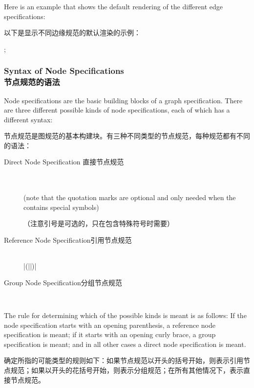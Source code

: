Here is an example that shows the default rendering of the different edge
specifications:

以下是显示不同边缘规范的默认渲染的示例：
%
\begin{codeexample}[preamble={\usetikzlibrary{graphs}}]
\tikz {};
\end{codeexample}


\subsubsection{Syntax of Node Specifications\\节点规范的语法}
\label{section-library-graphs-node-spec}

Node specifications are the basic building blocks of a graph specification.
There are three different possible kinds of node specifications, each of which
has a different syntax:

节点规范是图规范的基本构建块。有三种不同类型的节点规范，每种规范都有不同的语法：
%
\begin{description}
    \item[Direct Node Specification 直接节点规范]
        \ \\
         \\
        (note that the quotation marks are optional and only needed when the
         contains special symbols)

        （注意引号是可选的，只在包含特殊符号时需要）
    \item[Reference Node Specification引用节点规范]
        \ \\
        |(||)|
    \item[Group Node Specification分组节点规范]
        \ \\
\end{description}

The rule for determining which of the possible kinds is meant is as follows: If
the node specification starts with an opening parenthesis, a reference node
specification is meant; if it starts with an opening curly brace, a group
specification is meant; and in all other cases a direct node specification is
meant.

确定所指的可能类型的规则如下：如果节点规范以开头的括号开始，则表示引用节点规范；如果以开头的花括号开始，则表示分组规范；在所有其他情况下，表示直接节点规范。

